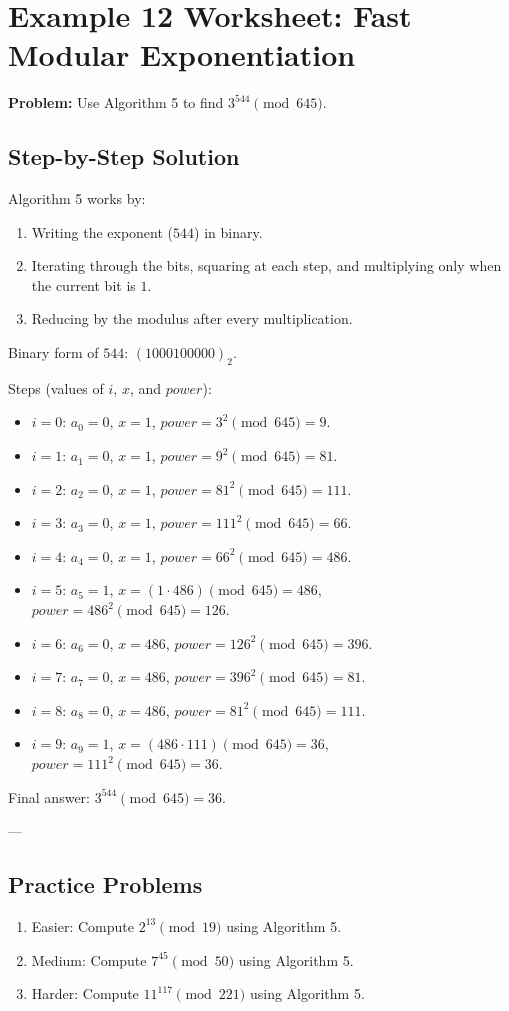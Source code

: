 \documentclass[12pt]{article}
\begin{document}
\section*{Example 12 Worksheet: Fast Modular Exponentiation}

\textbf{Problem:} Use Algorithm 5 to find $3^{544} \pmod{645}$.

\subsection*{Step-by-Step Solution}
Algorithm 5 works by:
\begin{enumerate}
    \item Writing the exponent ($544$) in binary.
    \item Iterating through the bits, squaring at each step, and multiplying only when the current bit is $1$.
    \item Reducing by the modulus after every multiplication.
\end{enumerate}

\noindent
Binary form of $544$: $(1000100000)_2$.

\noindent
Steps (values of $i$, $x$, and $power$):
\begin{itemize}
    \item $i=0$: $a_0=0$, $x=1$, $power = 3^2 \pmod{645} = 9$.
    \item $i=1$: $a_1=0$, $x=1$, $power = 9^2 \pmod{645} = 81$.
    \item $i=2$: $a_2=0$, $x=1$, $power = 81^2 \pmod{645} = 111$.
    \item $i=3$: $a_3=0$, $x=1$, $power = 111^2 \pmod{645} = 66$.
    \item $i=4$: $a_4=0$, $x=1$, $power = 66^2 \pmod{645} = 486$.
    \item $i=5$: $a_5=1$, $x=(1 \cdot 486) \pmod{645} = 486$, $power = 486^2 \pmod{645} = 126$.
    \item $i=6$: $a_6=0$, $x=486$, $power = 126^2 \pmod{645} = 396$.
    \item $i=7$: $a_7=0$, $x=486$, $power = 396^2 \pmod{645} = 81$.
    \item $i=8$: $a_8=0$, $x=486$, $power = 81^2 \pmod{645} = 111$.
    \item $i=9$: $a_9=1$, $x=(486 \cdot 111) \pmod{645} = 36$, $power = 111^2 \pmod{645} = 36$.
\end{itemize}

\noindent
Final answer: $3^{544} \pmod{645} = \boxed{36}$.

---

\subsection*{Practice Problems}

\begin{enumerate}
    \item Easier: Compute $2^{13} \pmod{19}$ using Algorithm 5.
    \item Medium: Compute $7^{45} \pmod{50}$ using Algorithm 5.
    \item Harder: Compute $11^{117} \pmod{221}$ using Algorithm 5.
\end{enumerate}
\end{document}
